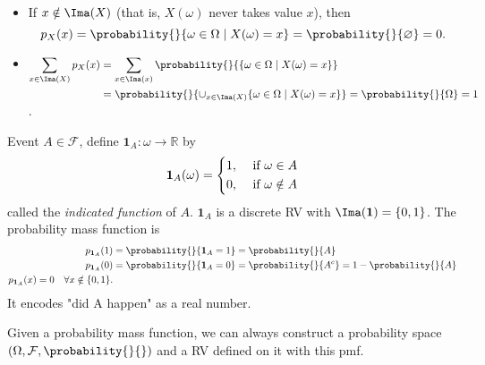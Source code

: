 \begin{note}
    \leavevmode
    \begin{itemize}
    \item If \(x \notin \Ima(X)\) (that is, \(X(\omega)\) never takes value \(x\)), then
    \[p_X(x) = \probability{}{\omega \in \Omega\mid X(\omega) = x}=\probability{}{\varnothing} = 0.\]
    \item \(\begin{aligned}[t]\sum\limits_{x\in \Ima(X)}p_X(x) &= \sum\limits_{x\in \Ima(x)}\probability{}{\{\omega \in \Omega\mid X(\omega) = x\}}\\
    &=\probability{}{\cup_{x\in \Ima(X)}\{\omega\in \Omega\mid X(\omega)=x\}}=\probability{}{\Omega} = 1 \end{aligned}\).
    \end{itemize}
\end{note}
\begin{example}
    Event \(A\in \mathcal{F} \), define \(\mathbf{1}_A:\omega \to \mathbb{R}\) by
    \[
    \textbf{1}_A(\omega) = \begin{dcases}
        1, &\text{ if } \omega \in A\\
        0, &\text{ if }\omega \notin A \\
    \end{dcases}
    \]
    called the \textit{indicated function} of \(A\). \(\textbf{1}_{A}\) is a discrete RV with \(\Ima(\textbf{1}) = \{0,1\}\). The probability mass function is
    \begin{align*}
        p_{\textbf{1}_A}(1) &= \probability{}{\textbf{1}_A = 1} = \probability{}{A}\\
        p_{\textbf{1}_A}(0) &= \probability{}{\textbf{1}_A = 0} = \probability{}{A^c} = 1 - \probability{}{A} \\
        p_{\textbf{1}_A}(x) = 0 \quad \forall x \notin \{0,1\}.
    \end{align*}
    It encodes "did A happen" as a real number.
\end{example}
\begin{remark}
    Given a probability mass function, we can always construct a probability space \((\Omega, \mathcal{F}, \probability{}{})\) and a RV defined on it with this pmf.
\end{remark}